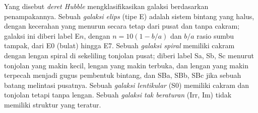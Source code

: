 \begin{definition}\label{def:b3:milky-way-galaxies:types}
Yang disebut \emph{deret Hubble} mengklasifikasikan galaksi berdasarkan
penampakannya. Sebuah \emph{galaksi elips}
(tipe E) adalah sistem bintang yang halus, dengan kecerahan yang menurun secara
tetap dari pusat dan tanpa cakram; galaksi ini diberi label E$n$, dengan $n = 10(1 - b/a)$
dan $b/a$ rasio sumbu tampak, dari E0 (bulat) hingga E7. Sebuah
\emph{galaksi spiral} memiliki cakram dengan lengan spiral
di sekeliling tonjolan pusat; diberi label Sa, Sb, Sc menurut tonjolan yang makin kecil,
lengan yang makin terbuka, dan lengan yang makin terpecah menjadi gugus pembentuk bintang, dan
SBa, SBb, SBc jika sebuah batang melintasi pusatnya. Sebuah \emph{galaksi
lentikular} (S0) memiliki cakram dan tonjolan tetapi tanpa lengan.
Sebuah \emph{galaksi tak beraturan} (Irr, Im) tidak memiliki
struktur yang teratur.
\end{definition}


